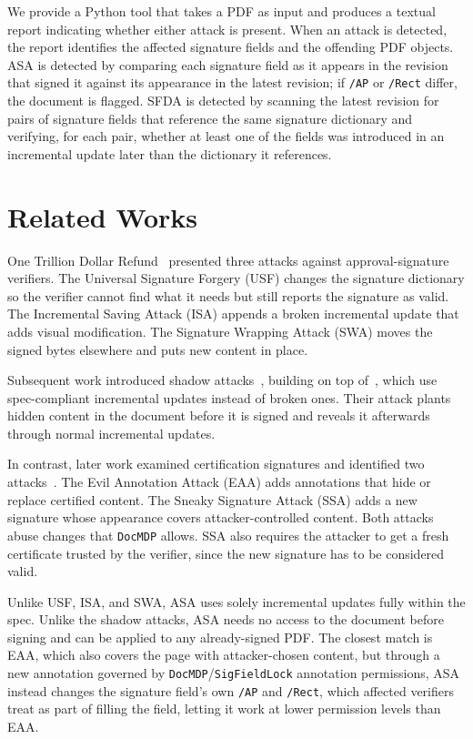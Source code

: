 \documentclass[12pt]{article}
\begin{document}
We provide a Python tool that takes a PDF as input and produces a textual report indicating whether either attack is present. When an attack is detected, the report identifies the affected signature fields and the offending PDF objects. ASA is detected by comparing each signature field as it appears in the revision that signed it against its appearance in the latest revision; if \texttt{/AP} or \texttt{/Rect} differ, the document is flagged. SFDA is detected by scanning the latest revision for pairs of signature fields that reference the same signature dictionary and verifying, for each pair, whether at least one of the fields was introduced in an incremental update later than the dictionary it references.


\section{Related Works} \label{sec:related-works}

One Trillion Dollar Refund~\cite{one-trillion-dollar-refund} presented three attacks against approval-signature verifiers. The Universal Signature Forgery (USF) changes the signature dictionary so the verifier cannot find what it needs but still reports the signature as valid. The Incremental Saving Attack (ISA) appends a broken incremental update that adds visual modification. The Signature Wrapping Attack (SWA) moves the signed bytes elsewhere and puts new content in place.

Subsequent work introduced shadow attacks~\cite{shadow-attacks}, building on top of~\cite{one-trillion-dollar-refund}, which use spec-compliant incremental updates instead of broken ones. Their attack plants hidden content in the document before it is signed and reveals it afterwards through normal incremental updates.

In contrast, later work examined certification signatures and identified two attacks~\cite{pdf-certification-attack}. The Evil Annotation Attack (EAA) adds annotations that hide or replace certified content. The Sneaky Signature Attack (SSA) adds a new signature whose appearance covers attacker-controlled content. Both attacks abuse changes that \texttt{DocMDP} allows. SSA also requires the attacker to get a fresh certificate trusted by the verifier, since the new signature has to be considered valid.

Unlike USF, ISA, and SWA, ASA uses solely incremental updates fully within the spec. Unlike the shadow attacks, ASA needs no access to the document before signing and can be applied to any already-signed PDF. The closest match is EAA, which also covers the page with attacker-chosen content, but through a new annotation governed by \texttt{DocMDP}/\texttt{SigFieldLock} annotation permissions, ASA instead changes the signature field's own \texttt{/AP} and \texttt{/Rect}, which affected verifiers treat as part of filling the field, letting it work at lower permission levels than EAA.
\end{document}
